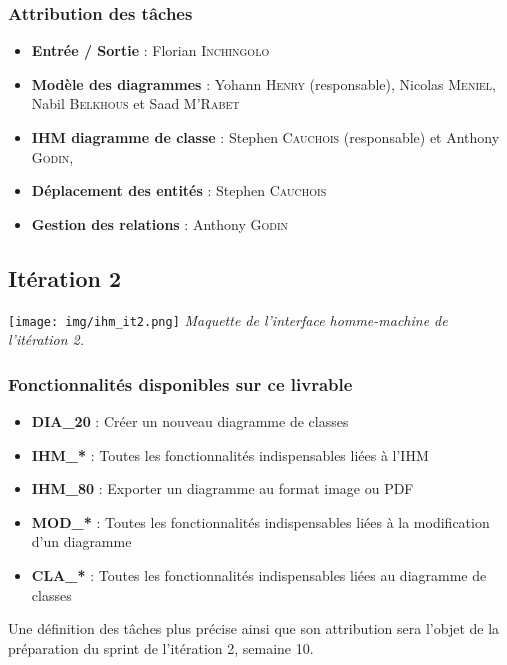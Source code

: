 \documentclass[hidelinks, 10pt,a4paper]{article}
\begin{document}
\subsubsection{Attribution des tâches}
\begin{itemize}
\item \textbf{Entrée / Sortie} : Florian \textsc{Inchingolo}
\item \textbf{Modèle des diagrammes} : Yohann \textsc{Henry} (responsable), Nicolas \textsc{Meniel},
Nabil \textsc{Belkhous} et Saad \textsc{M'Rabet}
\item \textbf{IHM diagramme de classe} : Stephen \textsc{Cauchois} (responsable) et Anthony \textsc{Godin},
\item \textbf{Déplacement des entités} : Stephen \textsc{Cauchois}
\item \textbf{Gestion des relations} : Anthony \textsc{Godin}
\end{itemize}

\subsection{Itération 2}
\begin{center}
  \texttt{[image: img/ihm\_it2.png]}
\textit{Maquette de l'interface homme-machine de l'itération 2.}
\end{center}

\subsubsection{Fonctionnalités disponibles sur ce livrable}
\begin{itemize}
  \item \textbf{DIA\_20} : Créer un nouveau diagramme de classes
  \item \textbf{IHM\_*} : Toutes les fonctionnalités indispensables liées à l'IHM
  \item \textbf{IHM\_80} : Exporter un diagramme au format image ou PDF
  \item \textbf{MOD\_*} : Toutes les fonctionnalités indispensables liées à la modification d'un diagramme
  \item \textbf{CLA\_*} : Toutes les fonctionnalités indispensables liées au diagramme de classes
\end{itemize}

Une définition des tâches plus précise ainsi que son attribution sera l'objet de la
préparation du sprint de l'itération 2, semaine 10.
\end{document}
